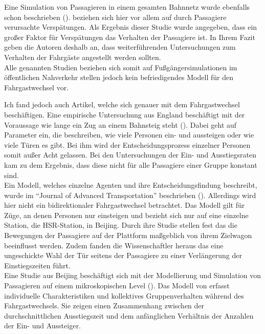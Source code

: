 Eine Simulation von Passagieren in einem gesamten Bahnnetz wurde ebenfalls schon beschrieben (\cite{Albert.2018}). \cite{Albert.2018} beziehen sich hier vor allem auf durch Passagiere verursachte Verspätungen. Als Ergebnis dieser Studie wurde angegeben, dass ein großer Faktor für Verspätungen das Verhalten der Passagiere ist. In Ihrem Fazit geben die Autoren deshalb an, dass weiterführenden Untersuchungen zum Verhalten der Fahrgäste angestellt werden sollten. \\
Alle genannten Studien beziehen sich somit auf Fußgängersimulationen im öffentlichen Nahverkehr stellen jedoch kein befriedigendes Modell für den Fahrgastwechsel vor.

Ich fand jedoch auch Artikel, welche sich genauer mit dem Fahrgastwechsel beschäftigen. Eine empirische Untersuchung aus England beschäftigt mit der Voraussage wie lange ein Zug an einem Bahnsteig steht (\cite{Harris.2006}). Dabei geht \cite{Harris.2006} auf Parameter ein, die \zB beschreiben, wie viele Personen ein- und aussteigen oder wie viele Türen es gibt. Bei ihm wird der Entscheidungsprozess einzelner Personen somit außer Acht gelassen. Bei den Untersuchungen der Ein- und Ausstiegsraten kam \cite{Harris.2006} zu dem Ergebnis, dass diese nicht für alle Passagiere einer Gruppe konstant sind. \\
Ein Modell, welches einzelne Agenten und ihre Entscheidungsfindung beschreibt, wurde im "`Journal of Advanced Transportation"' beschrieben (\cite{Tang.2017}). Allerdings wird hier nicht ein bidirektionaler Fahrgastwechsel betrachtet. Das Modell gilt für Züge, an denen Personen nur einsteigen und bezieht sich nur auf eine einzelne Station, die HSR-Station, in Beijing. Durch ihre Studie stellen \cite{Tang.2017} fest das die Bewegungen der Passagiere auf der Plattform maßgeblich von ihrem Zielwagon beeinflusst werden. Zudem fanden die Wissenschaftler heraus das eine ungeschickte Wahl der Tür seitens der Passagiere zu einer Verlängerung der Einstiegszeiten führt.\\
Eine Studie aus Beijing beschäftigt sich mit der Modellierung und Simulation von Passagieren auf einem mikroskopischen Level (\cite{Zhang.2008}). Das Modell von \cite{Zhang.2008} erfasst individuelle Charakteristiken und kollektives Gruppenverhalten während des Fahrgastwechsels. Sie zeigen einen Zusammenhang zwischen der durchschnittlichen Ausstiegszeit und dem anfänglichen Verhältnis der Anzahlen der Ein- und Aussteiger.


